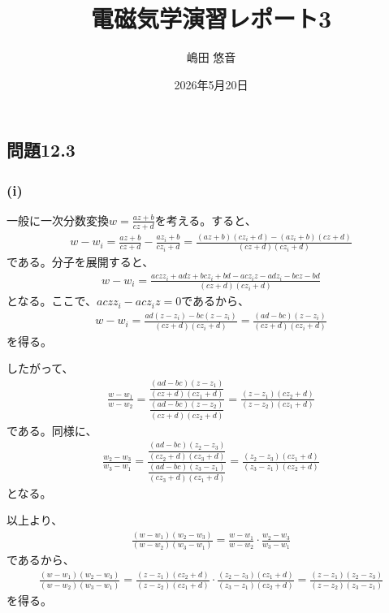 \documentclass[platex,dvipdfmx,a4paper]{jsarticle}
\title{電磁気学演習レポート3}
\author{嶋田 悠音}
\date{2026年5月20日}
\begin{document}
  \maketitle

  \subsection*{問題12.3}

  \subsubsection*{(i)}

  一般に一次分数変換$w=\frac{az+b}{cz+d}$を考える。すると、
  \begin{align*}
    w-w_i=\frac{az+b}{cz+d}-\frac{az_i+b}{cz_i+d}=\frac{(az+b)(cz_i+d)-(az_i+b)(cz+d)}{(cz+d)(cz_i+d)}
  \end{align*}
  である。分子を展開すると、
  \begin{align*}
    w-w_i=\frac{acz z_i+adz+bcz_i+bd-acz_i z-adz_i-bcz-bd}{(cz+d)(cz_i+d)}
  \end{align*}
  となる。ここで、$acz z_i-acz_i z=0$であるから、
  \begin{align*}
    w-w_i=\frac{ad(z-z_i)-bc(z-z_i)}{(cz+d)(cz_i+d)}=\frac{(ad-bc)(z-z_i)}{(cz+d)(cz_i+d)}
  \end{align*}
  を得る。

  したがって、
  \begin{align*}
    \frac{w-w_1}{w-w_2}=\frac{\dfrac{(ad-bc)(z-z_1)}{(cz+d)(cz_1+d)}}{\dfrac{(ad-bc)(z-z_2)}{(cz+d)(cz_2+d)}}=\frac{(z-z_1)(cz_2+d)}{(z-z_2)(cz_1+d)}
  \end{align*}
  である。同様に、
  \begin{align*}
    \frac{w_2-w_3}{w_3-w_1}=\frac{\dfrac{(ad-bc)(z_2-z_3)}{(cz_2+d)(cz_3+d)}}{\dfrac{(ad-bc)(z_3-z_1)}{(cz_3+d)(cz_1+d)}}=\frac{(z_2-z_3)(cz_1+d)}{(z_3-z_1)(cz_2+d)}
  \end{align*}
  となる。

  以上より、
  \begin{align*}
    \frac{(w-w_1)(w_2-w_3)}{(w-w_2)(w_3-w_1)}=\frac{w-w_1}{w-w_2}\cdot\frac{w_2-w_3}{w_3-w_1}
  \end{align*}
  であるから、
  \begin{align*}
    \frac{(w-w_1)(w_2-w_3)}{(w-w_2)(w_3-w_1)}=\frac{(z-z_1)(cz_2+d)}{(z-z_2)(cz_1+d)}\cdot\frac{(z_2-z_3)(cz_1+d)}{(z_3-z_1)(cz_2+d)}=\frac{(z-z_1)(z_2-z_3)}{(z-z_2)(z_3-z_1)}
  \end{align*}
  を得る。
\end{document}
